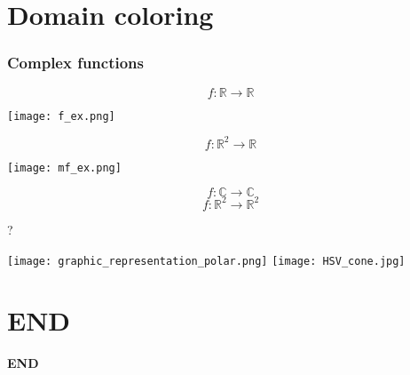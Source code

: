 \documentclass[11pt]{beamer}
\begin{document}
\section{Domain coloring}
\frametitle{Complex functions}
\begin{frame}
$$f\colon\mathbb{R}\to\mathbb{R}$$\pause
\begin{center}
\texttt{[image: f\_ex.png]}
\end{center}\pause
$$f\colon\mathbb{R}^2\to\mathbb{R}$$\pause
\begin{center}
\texttt{[image: mf\_ex.png]}
\end{center}\pause
$$f\colon\mathbb{C}\to\mathbb{C}$$
$$f\colon\mathbb{R}^2\to\mathbb{R}^2$$\pause
\begin{center}?\end{center}
\end{frame}
\begin{frame}
\begin{center}
\texttt{[image: graphic\_representation\_polar.png]}
\texttt{[image: HSV\_cone.jpg]}
\end{center}
\end{frame}
\section{END}
\begin{frame}
\Huge
\center
\textbf{END}
\end{frame}
\end{document}
